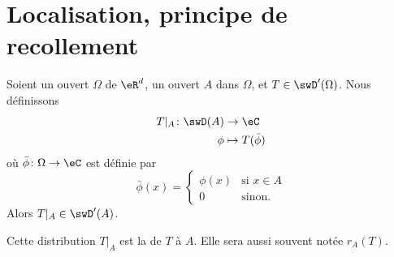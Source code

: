 \section{Localisation, principe de recollement}

\begin{propositionDef}     \label{PROPooNCHIooNOPfBt}
	Soient un ouvert \( \Omega\) de \( \eR^d\), un ouvert \( A\) dans \( \Omega\), et \( T\in\swD'(\Omega)\). Nous définissons
	\begin{equation}
		\begin{aligned}
			T|_A\colon \swD(A) & \to \eC              \\
			\phi               & \mapsto T(\bar \phi)
		\end{aligned}
	\end{equation}
	où  \(\bar \phi\colon \Omega\to \eC\) est définie par
	\begin{equation}
		\bar\phi(x)=\begin{cases}
			\phi(x) & \text{si }  x\in A \\
			0       & \text{sinon. }
		\end{cases}
	\end{equation}
	Alors \( T|_A\in \swD'(A)\).

	Cette distribution \( T|_A\) est la  de \( T\) à \( A\). Elle sera aussi souvent notée \( r_A(T)\).
\end{propositionDef}


